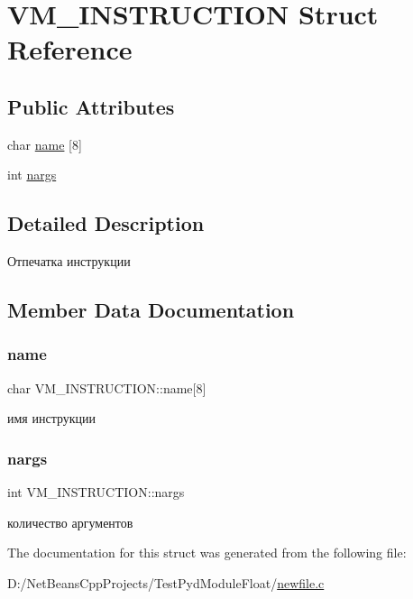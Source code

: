 \hypertarget{struct_v_m___i_n_s_t_r_u_c_t_i_o_n}{}\section{V\+M\+\_\+\+I\+N\+S\+T\+R\+U\+C\+T\+I\+ON Struct Reference}
\label{struct_v_m___i_n_s_t_r_u_c_t_i_o_n}
\subsection*{Public Attributes}
\begin{DoxyCompactItemize}
\item 
char \hyperlink{struct_v_m___i_n_s_t_r_u_c_t_i_o_n_a7ba2d8dca2db13e7afb5cc2985bcd1d8}{name} \mbox{[}8\mbox{]}
\item 
int \hyperlink{struct_v_m___i_n_s_t_r_u_c_t_i_o_n_a4d4cf909e9288d25c75b7ce1eae49e17}{nargs}
\end{DoxyCompactItemize}


\subsection{Detailed Description}
Отпечатка инструкции 

\subsection{Member Data Documentation}
\mbox{\label{struct_v_m___i_n_s_t_r_u_c_t_i_o_n_a7ba2d8dca2db13e7afb5cc2985bcd1d8}} 
\subsubsection{\texorpdfstring{name}{name}}
{\footnotesize\ttfamily char V\+M\+\_\+\+I\+N\+S\+T\+R\+U\+C\+T\+I\+O\+N\+::name\mbox{[}8\mbox{]}}

имя инструкции \mbox{\label{struct_v_m___i_n_s_t_r_u_c_t_i_o_n_a4d4cf909e9288d25c75b7ce1eae49e17}} 
\subsubsection{\texorpdfstring{nargs}{nargs}}
{\footnotesize\ttfamily int V\+M\+\_\+\+I\+N\+S\+T\+R\+U\+C\+T\+I\+O\+N\+::nargs}

количество аргументов 

The documentation for this struct was generated from the following file\+:\begin{DoxyCompactItemize}
\item 
D\+:/\+Net\+Beans\+Cpp\+Projects/\+Test\+Pyd\+Module\+Float/\hyperlink{newfile_8c}{newfile.\+c}\end{DoxyCompactItemize}
